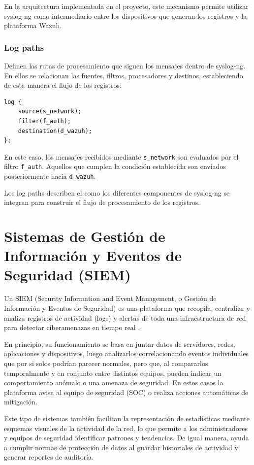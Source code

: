 En la arquitectura implementada en el proyecto, este mecanismo permite utilizar syslog-ng como intermediario entre los dispositivos que generan los registros y la plataforma Wazuh.

\subsubsection{Log paths}
Definen las rutas de procesamiento que siguen los mensajes dentro de syslog-ng. En ellos se relacionan las fuentes, filtros, procesadores y destinos, estableciendo de esta manera el flujo de los registros:

\begin{lstlisting}[style=logstyle]
log {
    source(s_network);
    filter(f_auth);
    destination(d_wazuh);
};
\end{lstlisting}

En este caso, los mensajes recibidos mediante \texttt{s\_network} son evaluados por el filtro \texttt{f\_auth}. Aquellos que cumplen la condición establecida son enviados posteriormente hacia \texttt{d\_wazuh}.

Los log paths describen el como los diferentes componentes de syslog-ng se integran para construir el flujo de procesamiento de los registros.

\section{Sistemas de Gestión de Información y Eventos de Seguridad (SIEM)}
Un SIEM (Security Information and Event Management, o Gestión de Información y Eventos de Seguridad) es una plataforma que recopila, centraliza y analiza registros de actividad (logs) y alertas de toda una infraestructura de red para detectar ciberamenazas en tiempo real \cite{microsoft_siem}.

En principio, su funcionamiento se basa en juntar datos de servidores, redes, aplicaciones y dispositivos, luego analizarlos correlacionando eventos individuales que por si solos podrían parecer normales, pero que, al compararlos temporalmente y en conjunto entre distintos equipos, pueden indicar un comportamiento anómalo o una amenaza de seguridad. En estos casos la plataforma avisa al equipo de seguridad (SOC) o realiza acciones automáticas de mitigación.

Este tipo de sistemas también facilitan la representación de estadísticas mediante esquemas visuales de la actividad de la red, lo que permite a los administradores y equipos de seguridad identificar patrones y tendencias. De igual manera, ayuda a cumplir normas de protección de datos al guardar historiales de actividad y generar reportes de auditoría.

